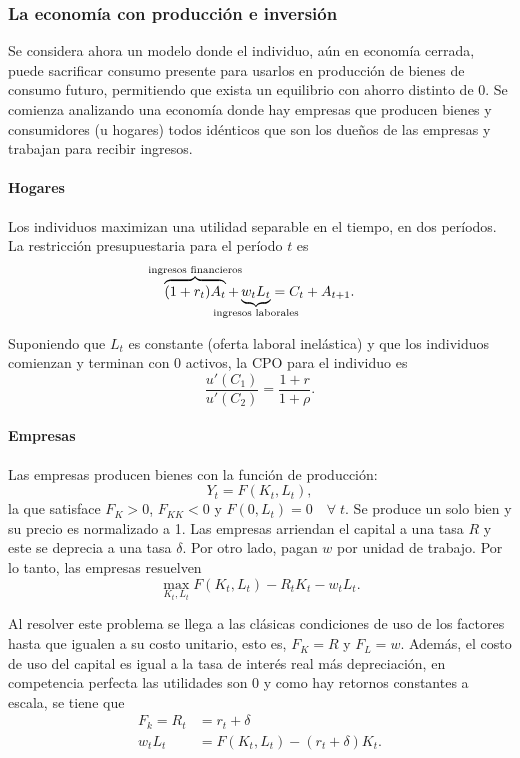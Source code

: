 \documentclass[DeGregorioResumen]{subfiles}
\begin{document}
\subsubsection{La economía con producción e inversión}

Se considera ahora un modelo donde el individuo, aún en economía cerrada, puede sacrificar consumo presente para usarlos en producción de bienes de consumo futuro, permitiendo que exista un equilibrio con ahorro distinto de 0. Se comienza analizando una economía donde hay empresas que producen bienes y consumidores (u hogares) todos idénticos que son los dueños de las empresas y trabajan para recibir ingresos.

\paragraph{Hogares}
Los individuos maximizan una utilidad separable en el tiempo, en dos períodos. La restricción presupuestaria para el período $t$ es
\begin{equation}
	\overbrace{(1+r_t)A_t}^{\mathclap{\text{ingresos financieros}}} + \underbrace{w_tL_t}_{\mathclap{\text{ingresos laborales}}} = C_t + A_{t+1}.
	\label{eq:06-restriccion_presup_indiv}
\end{equation}

Suponiendo que $L_t$ es constante (oferta laboral inelástica) y que los individuos comienzan y terminan con 0 activos, la CPO para el individuo es
\[
	\frac{u'(C_1)}{u'(C_2)} = \frac{1+r}{1+\rho}.
\]

\paragraph{Empresas}
Las empresas producen bienes con la función de producción:
\[
	Y_t = F(K_t, L_t),
\]
la que satisface $F_K>0$, $F_{KK}<0$ y $F(0, L_t)=0 \quad \forall \; t$. Se produce un solo bien y su precio es normalizado a 1. Las empresas arriendan el capital a una tasa $R$ y este se deprecia a una tasa $\delta$. Por otro lado, pagan $w$ por unidad de trabajo. Por lo tanto, las empresas resuelven
\[
\max_{K_t, L_t} F(K_t, L_t) - R_tK_t -w_tL_t.
\]

Al resolver este problema se llega a las clásicas condiciones de uso de los factores hasta que igualen a su costo unitario, esto es, $F_K=R$ y $F_L = w$. Además, el costo de uso del capital es igual a la tasa de interés real más depreciación, en competencia perfecta las utilidades son 0 y como hay retornos constantes a escala, se tiene que
\begin{align}
	F_k = R_t &= r_t + \delta \nonumber \\ 
	w_tL_t &= F(K_t, L_t) - (r_t+\delta)K_t.
	\label{eq:06-rest_empresas}
\end{align}
\end{document}
